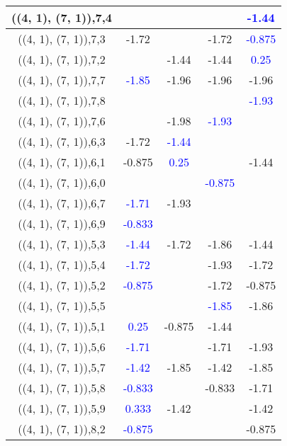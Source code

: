\documentclass{article}
\begin{document}
\begin{center}
\begin{longtable}{|c|c|c|c|c|}
        	\hline
        	((4, 1), (7, 1)),7,4&&&& \textcolor{blue}{-1.44}\\
        	\hline
        	((4, 1), (7, 1)),7,3&-1.72&&-1.72& \textcolor{blue}{-0.875}\\
        	\hline
        	((4, 1), (7, 1)),7,2&&-1.44&-1.44& \textcolor{blue}{0.25}\\
        	\hline
        	((4, 1), (7, 1)),7,7& \textcolor{blue}{-1.85}&-1.96&-1.96&-1.96\\
        	\hline
        	((4, 1), (7, 1)),7,8&&&& \textcolor{blue}{-1.93}\\
        	\hline
        	((4, 1), (7, 1)),7,6&&-1.98& \textcolor{blue}{-1.93}&\\
        	\hline
        	((4, 1), (7, 1)),6,3&-1.72& \textcolor{blue}{-1.44}&&\\
        	\hline
        	((4, 1), (7, 1)),6,1&-0.875& \textcolor{blue}{0.25}&&-1.44\\
        	\hline
        	((4, 1), (7, 1)),6,0&&& \textcolor{blue}{-0.875}&\\
        	\hline
        	((4, 1), (7, 1)),6,7& \textcolor{blue}{-1.71}&-1.93&&\\
        	\hline
        	((4, 1), (7, 1)),6,9& \textcolor{blue}{-0.833}&&&\\
        	\hline
        	((4, 1), (7, 1)),5,3& \textcolor{blue}{-1.44}&-1.72&-1.86&-1.44\\
        	\hline
        	((4, 1), (7, 1)),5,4& \textcolor{blue}{-1.72}&&-1.93&-1.72\\
        	\hline
        	((4, 1), (7, 1)),5,2& \textcolor{blue}{-0.875}&&-1.72&-0.875\\
        	\hline
        	((4, 1), (7, 1)),5,5&&& \textcolor{blue}{-1.85}&-1.86\\
        	\hline
        	((4, 1), (7, 1)),5,1& \textcolor{blue}{0.25}&-0.875&-1.44&\\
        	\hline
        	((4, 1), (7, 1)),5,6& \textcolor{blue}{-1.71}&&-1.71&-1.93\\
        	\hline
        	((4, 1), (7, 1)),5,7& \textcolor{blue}{-1.42}&-1.85&-1.42&-1.85\\
        	\hline
        	((4, 1), (7, 1)),5,8& \textcolor{blue}{-0.833}&&-0.833&-1.71\\
        	\hline
        	((4, 1), (7, 1)),5,9& \textcolor{blue}{0.333}&-1.42&&-1.42\\
        	\hline
        	((4, 1), (7, 1)),8,2& \textcolor{blue}{-0.875}&&&-0.875\\

\end{longtable}
\end{center}
\end{document}
